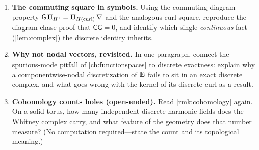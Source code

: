 \begin{enumerate}[nosep]
  edge differences $\sum_j \pm(u_{\mathrm{head}(e_j)}-u_{\mathrm{tail}(e_j)})$ around the
  loop is zero. (This is $\mathsf{C}\mathsf{G}=0$ for one face; the sign on $e_j$ is its
  orientation relative to the loop traversal.)
\item \textbf{The commuting square in symbols.} Using the commuting-diagram property
  $\mathsf{G}\,\Pi_{H^1}=\Pi_{H(\mathrm{curl})}\,\nabla$ and the analogous curl square, reproduce
  the diagram-chase proof that $\mathsf{C}\mathsf{G}=0$, and identify which single
  \emph{continuous} fact (\cref{lem:complex}) the discrete identity inherits.
\item \textbf{Why not nodal vectors, revisited.} In one paragraph, connect the
  spurious-mode pitfall of \cref{ch:functionspaces} to discrete exactness: explain why a
  componentwise-nodal discretization of $\mathbf{E}$ fails to sit in an exact discrete complex,
  and what goes wrong with the kernel of its discrete curl as a result.
\item \textbf{Cohomology counts holes (open-ended).} Read \cref{rmk:cohomology} again. On
  a solid torus, how many independent discrete harmonic fields does the Whitney complex
  carry, and what feature of the geometry does that number measure? (No computation
  required---state the count and its topological meaning.)
\end{enumerate}
